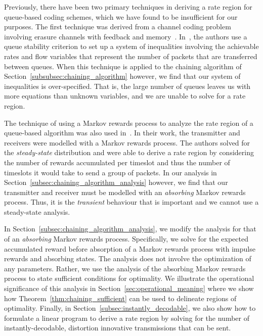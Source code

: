Previously, there have been two primary techniques in deriving a rate region for queue-based coding schemes, which we have found to be insufficient for our purposes.  The first technique was derived from a channel coding problem involving erasure channels with feedback and memory~\cite{HeindlmaierBidokhti16}.  In~\cite{HeindlmaierBidokhti16}, the authors use a queue stability criterion to set up a system of inequalities involving the achievable rates and flow variables that represent the number of packets that are transferred between queues.  When this technique is applied to the chaining algorithm of Section~\ref{subsubsec:chaining_algorithm} however, we find that our system of inequalities is over-specified.  That is, the large number of queues leaves us with more equations than unknown variables, and we are unable to solve for a rate region.  

The technique of using a Markov rewards process to analyze the rate region of a queue-based algorithm was also used in~\cite{GeorgiadisTassiulas_Netcod09}.  In their work, the transmitter and receivers were modelled with a Markov rewards process.  The authors solved for the \emph{steady-state} distribution and were able to derive a rate region by considering the number of rewards accumulated per timeslot and thus the number of timeslots it would take to send a group of packets.  In our analysis in Section~\ref{subsec:chaining_algorithm_analysis} however, we find that our transmitter and receiver must be modelled with an \emph{absorbing} Markov rewards process.  Thus, it is the \emph{transient} behaviour that is important and we cannot use a steady-state analysis.

In Section~\ref{subsec:chaining_algorithm_analysis}, we modify the analysis for that of an \emph{absorbing} Markov rewards process.  Specifically, we solve for the expected accumulated reward before absorption of a Markov rewards process with impulse rewards and absorbing states. The analysis does not involve the optimization of any parameters.  Rather, we use the analysis of the absorbing Markov rewards process to state sufficient conditions for optimality.  We illustrate the operational significance of this analysis in Section~\ref{sec:operational_meaning} where we show how Theorem~\ref{thm:chaining_sufficient} can be used to delineate regions of optimality.  Finally, in Section~\ref{subsec:instantly_decodable}, we also show how to formulate a linear program to derive a rate region by solving for the number of instantly-decodable, distortion innovative transmissions that can be sent.


